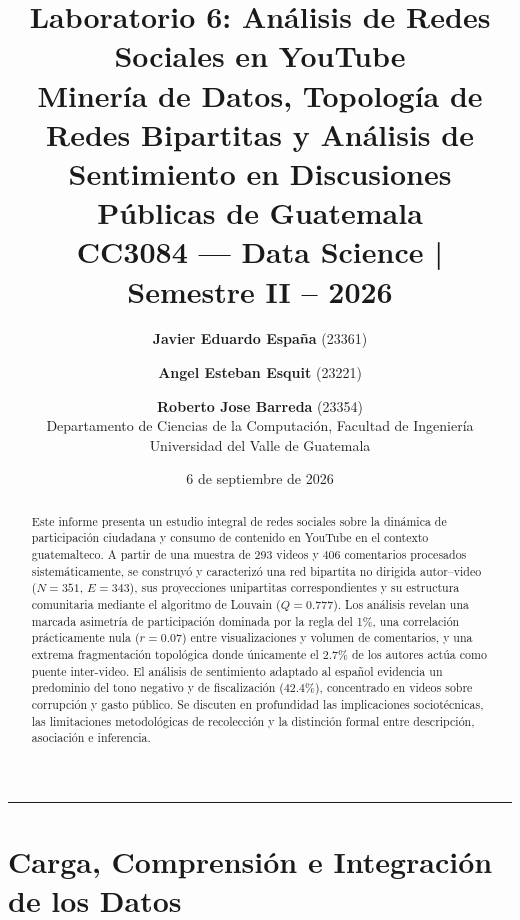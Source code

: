 \documentclass[11pt,a4paper]{article}
\title{\vspace{-1.5cm}\textbf{\Huge Laboratorio 6: Análisis de Redes Sociales en YouTube}\\[0.3cm]
\Large Minería de Datos, Topología de Redes Bipartitas y Análisis de Sentimiento en Discusiones Públicas de Guatemala\\[0.2cm]
\large CC3084 — Data Science | Semestre II – 2026}
\author{
    \textbf{Javier Eduardo España} (23361) \and
    \textbf{Angel Esteban Esquit} (23221) \and
    \textbf{Roberto Jose Barreda} (23354)\\[0.2cm]
    \normalsize Departamento de Ciencias de la Computación, Facultad de Ingeniería\\
    \normalsize Universidad del Valle de Guatemala
}
\date{6 de septiembre de 2026}
\begin{document}
\maketitle

\begin{abstract}
\noindent Este informe presenta un estudio integral de redes sociales sobre la dinámica de participación ciudadana y consumo de contenido en YouTube en el contexto guatemalteco. A partir de una muestra de 293 videos y 406 comentarios procesados sistemáticamente, se construyó y caracterizó una red bipartita no dirigida autor--video ($N=351$, $E=343$), sus proyecciones unipartitas correspondientes y su estructura comunitaria mediante el algoritmo de Louvain ($Q = 0.777$). Los análisis revelan una marcada asimetría de participación dominada por la regla del 1\%, una correlación prácticamente nula ($r=0.07$) entre visualizaciones y volumen de comentarios, y una extrema fragmentación topológica donde únicamente el $2.7\%$ de los autores actúa como puente inter-video. El análisis de sentimiento adaptado al español evidencia un predominio del tono negativo y de fiscalización ($42.4\%$), concentrado en videos sobre corrupción y gasto público. Se discuten en profundidad las implicaciones sociotécnicas, las limitaciones metodológicas de recolección y la distinción formal entre descripción, asociación e inferencia.
\end{abstract}

\vspace{0.3cm}
\hrule
\vspace{0.4cm}

\section{Carga, Comprensión e Integración de los Datos}
\end{document}
